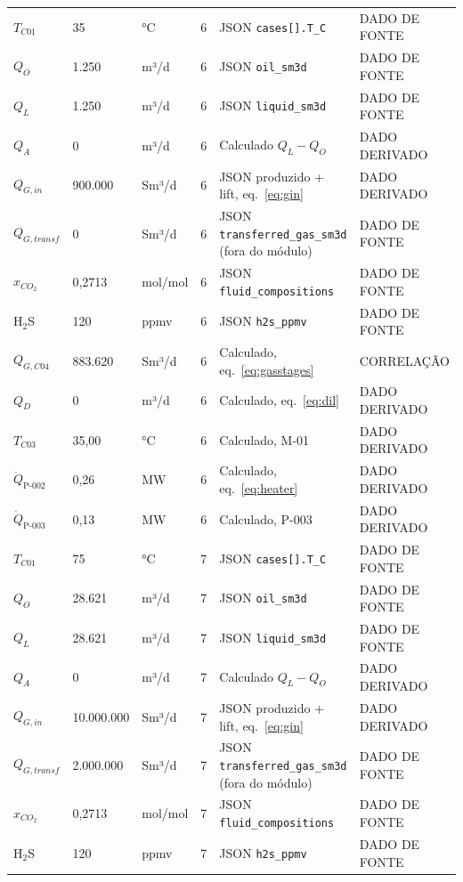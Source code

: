 \documentclass[11pt,a4paper]{article}
\numberwithin{equation}{section}
\numberwithin{table}{section}
\numberwithin{figure}{section}
\newcommand{\tipo}[1]{\textsf{\footnotesize #1}}
\begin{document}
{\begin{longtable}{L{3.6cm}L{2.2cm}lL{1.0cm}L{4.2cm}l}
$T_{C01}$ & 35 & °C & 6 & JSON \texttt{cases[].T\_C} & \tipo{DADO DE FONTE}\\
$Q_{O}$ & 1.250 & m³/d & 6 & JSON \texttt{oil\_sm3d} & \tipo{DADO DE FONTE}\\
$Q_{L}$ & 1.250 & m³/d & 6 & JSON \texttt{liquid\_sm3d} & \tipo{DADO DE FONTE}\\
$Q_{A}$ & 0 & m³/d & 6 & Calculado $Q_L-Q_O$ & \tipo{DADO DERIVADO}\\
$Q_{G,in}$ & 900.000 & Sm³/d & 6 & JSON produzido + lift, eq.~\eqref{eq:gin} & \tipo{DADO DERIVADO}\\
$Q_{G,transf}$ & 0 & Sm³/d & 6 & JSON \texttt{transferred\_gas\_sm3d} (fora do módulo) & \tipo{DADO DE FONTE}\\
$x_{CO_2}$ & 0{,}2713 & mol/mol & 6 & JSON \texttt{fluid\_compositions} & \tipo{DADO DE FONTE}\\
H$_2$S & 120 & ppmv & 6 & JSON \texttt{h2s\_ppmv} & \tipo{DADO DE FONTE}\\
$Q_{G,C04}$ & 883.620 & Sm³/d & 6 & Calculado, eq.~\eqref{eq:gasstages} & \tipo{CORRELAÇÃO}\\
$Q_{D}$ & 0 & m³/d & 6 & Calculado, eq.~\eqref{eq:dil} & \tipo{DADO DERIVADO}\\
$T_{C03}$ & 35,00 & °C & 6 & Calculado, M-01 & \tipo{DADO DERIVADO}\\
$\dot Q_{\mbox{P-002}}$ & 0,26 & MW & 6 & Calculado, eq.~\eqref{eq:heater} & \tipo{DADO DERIVADO}\\
$\dot Q_{\mbox{P-003}}$ & 0,13 & MW & 6 & Calculado, P-003 & \tipo{DADO DERIVADO}\\
$T_{C01}$ & 75 & °C & 7 & JSON \texttt{cases[].T\_C} & \tipo{DADO DE FONTE}\\
$Q_{O}$ & 28.621 & m³/d & 7 & JSON \texttt{oil\_sm3d} & \tipo{DADO DE FONTE}\\
$Q_{L}$ & 28.621 & m³/d & 7 & JSON \texttt{liquid\_sm3d} & \tipo{DADO DE FONTE}\\
$Q_{A}$ & 0 & m³/d & 7 & Calculado $Q_L-Q_O$ & \tipo{DADO DERIVADO}\\
$Q_{G,in}$ & 10.000.000 & Sm³/d & 7 & JSON produzido + lift, eq.~\eqref{eq:gin} & \tipo{DADO DERIVADO}\\
$Q_{G,transf}$ & 2.000.000 & Sm³/d & 7 & JSON \texttt{transferred\_gas\_sm3d} (fora do módulo) & \tipo{DADO DE FONTE}\\
$x_{CO_2}$ & 0{,}2713 & mol/mol & 7 & JSON \texttt{fluid\_compositions} & \tipo{DADO DE FONTE}\\
H$_2$S & 120 & ppmv & 7 & JSON \texttt{h2s\_ppmv} & \tipo{DADO DE FONTE}\\

\end{longtable}}
\end{document}
